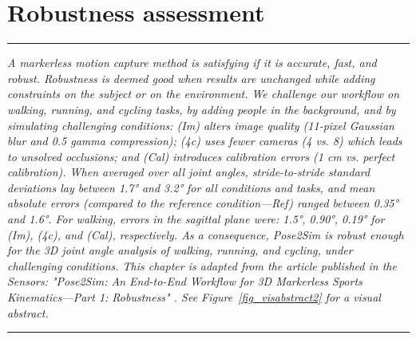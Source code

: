 
\lhead[\fancyplain{}{\leftmark}]%
      {\fancyplain{}{}} %
\chead[\fancyplain{}{}]%
      {\fancyplain{}{}}
\rhead[\fancyplain{}{}]%
      {\fancyplain{}{\rightmark}}%
\lfoot[\fancyplain{}{}]%
      {\fancyplain{}{}}
\cfoot[\fancyplain{}{\thepage}]%
      {\fancyplain{}{\thepage}} %
\rfoot[\fancyplain{}{}]%
     {\fancyplain{}{\scriptsize}}



\chapter{Robustness assessment}
\label{ch:4}


\begin{center}
\rule{0.7\linewidth}{.5pt}
\begin{minipage}{0.7\linewidth}
\smallskip

\textit{A markerless motion capture method is satisfying if it is accurate, fast, and robust. Robustness is deemed good when results are unchanged while adding constraints on the subject or on the environment. We challenge our workflow on walking, running, and cycling tasks, by adding people in the background, and by simulating challenging conditions: (Im) alters image quality (11-pixel Gaussian blur and 0.5 gamma compression); (4c) uses fewer cameras (4 vs. 8) which leads to unsolved occlusions; and (Cal) introduces calibration errors (1 cm vs. perfect calibration).\newline \newline
When averaged over all joint angles, stride-to-stride standard deviations lay between 1.7° and 3.2° for all conditions and tasks, and mean absolute errors (compared to the reference condition—Ref) ranged between 0.35° and 1.6°. For walking, errors in the sagittal plane were: 1.5°, 0.90°, 0.19° for (Im), (4c), and (Cal), respectively. As a consequence, Pose2Sim is robust enough for the 3D joint angle analysis of walking, running, and cycling, under challenging conditions.\newline\newline
This chapter is adapted from the article published in the Sensors: "Pose2Sim: An End-to-End Workflow for 3D Markerless Sports Kinematics—Part 1: Robustness" \cite{Pagnon2021}. See Figure~\ref{fig_visabstract2} for a visual abstract.
}


\end{minipage}
\smallskip
\rule{0.7\linewidth}{.5pt}
\end{center}


